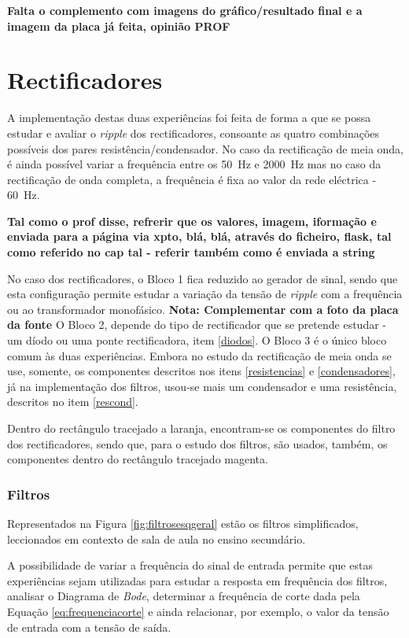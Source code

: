 \textbf{Falta o complemento com imagens do gráfico/resultado final e a imagem da placa já feita, opinião PROF}


\section{Rectificadores}
A implementação destas duas experiências foi feita de forma a que se possa estudar e avaliar o \textit{ripple} dos rectificadores, consoante as quatro combinações possíveis dos pares resistência/condensador. No caso da rectificação de meia onda, é ainda possível variar a frequência entre os \SI{50}{\hertz} e \SI{2000}{\hertz} mas no caso da rectificação de onda completa, a frequência é fixa ao valor da rede eléctrica - \SI{60}{\hertz}.

\textbf{Tal como o prof disse, refrerir que os valores, imagem, iformação e enviada para a página via xpto, blá, blá, através do ficheiro, flask, tal como referido no cap tal - referir também como é enviada a string}

No caso dos rectificadores, o Bloco 1 fica reduzido ao gerador de sinal, sendo que esta configuração permite estudar a variação da tensão de \textit{ripple} com a frequência ou ao transformador monofásico. \textbf{Nota: Complementar com a foto da placa da fonte} O Bloco 2, depende do tipo de rectificador que se pretende estudar - um díodo ou uma ponte rectificadora, item \ref{diodos}. O Bloco 3 é o único bloco comum às duas experiências. Embora no estudo da rectificação de meia onda se use, somente, os componentes descritos nos itens \ref{resistencias} e \ref{condensadores}, já na implementação dos filtros, usou-se mais um condensador e uma resistência, descritos no item \ref{rescond}. 

Dentro do rectângulo tracejado a laranja, encontram-se os componentes do filtro dos rectificadores, sendo que, para o estudo dos filtros, são usados, também, os componentes dentro do rectângulo tracejado magenta.


\subsubsection{Filtros}
\label{sec:filtros}
Representados na Figura \ref{fig:filtrosesqgeral} estão os filtros simplificados, leccionados em contexto de sala de aula no ensino secundário.

A possibilidade de variar a frequência do sinal de entrada permite que estas experiências sejam utilizadas para estudar a resposta em frequência dos filtros, analisar o Diagrama de \textit{Bode}, determinar a frequência de corte dada pela Equação \ref{eq:frequenciacorte} e ainda relacionar, por exemplo, o valor da tensão de entrada com a tensão de saída. 

